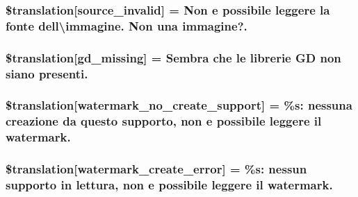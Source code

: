 \subsubsection[{\$translation}]{\setlength{\rightskip}{0pt plus 5cm}\$translation\mbox{[}\textquotesingle{}source\+\_\+invalid\textquotesingle{}\mbox{]} = \textquotesingle{}Non e possibile leggere la fonte dell\textbackslash{}\textquotesingle{}immagine. Non una immagine?.\textquotesingle{}}\label{class_8upload_8it___i_t_8php_a6ab0a660b457eaf2d3434b225449fdd6}
\hypertarget{class_8upload_8it___i_t_8php_a7f3dfcc0db4bbc0f2e7210c439798e56}{}
\subsubsection[{\$translation}]{\setlength{\rightskip}{0pt plus 5cm}\$translation\mbox{[}\textquotesingle{}gd\+\_\+missing\textquotesingle{}\mbox{]} = \textquotesingle{}Sembra che le librerie G\+D non siano presenti.\textquotesingle{}}\label{class_8upload_8it___i_t_8php_a7f3dfcc0db4bbc0f2e7210c439798e56}
\hypertarget{class_8upload_8it___i_t_8php_a82d5853430ab72dc1f9799ec36144cc6}{}
\subsubsection[{\$translation}]{\setlength{\rightskip}{0pt plus 5cm}\$translation\mbox{[}\textquotesingle{}watermark\+\_\+no\+\_\+create\+\_\+support\textquotesingle{}\mbox{]} = \textquotesingle{}\%s\+: nessuna creazione da questo supporto, non e possibile leggere il watermark.\textquotesingle{}}\label{class_8upload_8it___i_t_8php_a82d5853430ab72dc1f9799ec36144cc6}
\hypertarget{class_8upload_8it___i_t_8php_aabca0b65dadbc6184415c16375f284ca}{}
\subsubsection[{\$translation}]{\setlength{\rightskip}{0pt plus 5cm}\$translation\mbox{[}\textquotesingle{}watermark\+\_\+create\+\_\+error\textquotesingle{}\mbox{]} = \textquotesingle{}\%s\+: nessun supporto in lettura, non e possibile leggere il watermark.\textquotesingle{}}\label{class_8upload_8it___i_t_8php_aabca0b65dadbc6184415c16375f284ca}
\hypertarget{class_8upload_8it___i_t_8php_ac336e7a5701e47ba4a05e9e498a3cc44}{}
